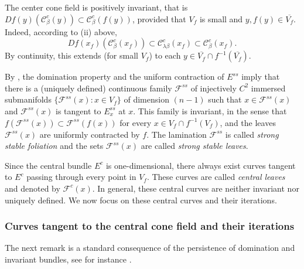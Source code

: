 \documentclass[11pt,reqno]{amsart}
\theoremstyle{plain}
\newtheorem*{theorem A}{Theorem A}
\newtheorem*{theorem B}{Theorem B}
\newtheorem*{theorem C}{Theorem C}
\newtheorem*{theorem 1}{Theorem 1}
\newtheorem*{theorem 2}{Theorem 2}
\newtheorem*{theorem 3}{Theorem 3}
\numberwithin{equation}{section}
\begin{document}
The center cone field is positively invariant, that is $Df(y)( \mathcal{C}_\beta ^{c}(y)) \subset \mathcal{C}_\beta ^{c}(f(y))$, provided that $V_f$ is small and $y, f(y)\in \overline{V_f}$.
Indeed, according to (ii) above,
$$
Df(x_f)(\mathcal{C}_\beta ^{c}(x_f)) \subset \mathcal{C}_{\lambda \beta} ^{c}(x_f) \subset \mathcal{C}_\beta ^{c}(x_f).
$$
By continuity, this extends (for small $V_f$) to each $y \in \overline{V_f} \cap f^{-1}(\overline{V_f})$.

By \cite{brin1974partially, hirsch1977invariant}, the domination property and the uniform contraction of $E^{ss}$ imply that there is a (uniquely defined) continuous family $\mathcal{F}^{ss}$ of injectively $C^2$ immersed submanifolds $\{\mathcal{F}^{ss}(x) \colon x \in V_f \}$ of dimension $(n-1)$ such that $x \in \mathcal{F}^{ss}(x)$ and $\mathcal{F}^{ss}(x)$ is tangent to $E^{ss}_x$ at $x$.
This family is invariant, in the sense that $f(\mathcal{F}^{ss}(x))\subset\mathcal{F}^{ss}(f(x))$ for every $x \in V_f \cap f^{-1}(V_f)$, and the leaves $\mathcal{F}^{ss}(x)$ are uniformly contracted by $f$.
The lamination $\mathcal{F}^{ss}$ is called \emph{strong stable foliation} and the sets $\mathcal{F}^{ss}(x)$ are called \emph{strong stable leaves}.

Since the central bundle $E^{c}$ is one-dimensional, there always exist curves tangent to $E^c$ passing through every point in $V_f$.
These curves are called \emph{central leaves} and denoted by $\mathcal{F}^{c}(x)$.
In general, these central curves are neither invariant nor uniquely defined.
We now focus on these central curves and their iterations.

\subsubsection{Curves tangent to the central cone field and their iterations}\label{sss.curvestangento}

The next remark is a standard consequence of the persistence of domination and invariant bundles, see for instance \cite[Section B1]{bonatti2004dynamics}.
\end{document}
